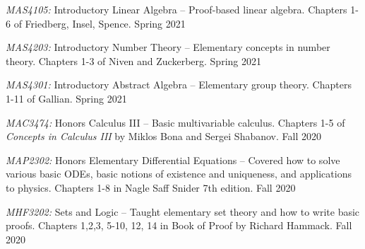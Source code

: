 \documentclass[11pt]{article}
\begin{document}
\textsl{MAS4105:} Introductory Linear Algebra -- Proof-based linear algebra. Chapters 1-6 of Friedberg, Insel, Spence. Spring 2021

\textsl{MAS4203:} Introductory Number Theory -- Elementary concepts in number theory. Chapters 1-3 of Niven and Zuckerberg. Spring 2021

\textsl{MAS4301:} Introductory Abstract Algebra -- Elementary group theory. Chapters 1-11 of Gallian. Spring 2021

\textsl{MAC3474:} Honors Calculus III -- Basic multivariable calculus. Chapters 1-5 of \textsl{Concepts in Calculus III} by Miklos Bona and Sergei Shabanov. Fall 2020

\textsl{MAP2302:} Honors Elementary Differential Equations -- Covered how to solve various basic ODEs, basic notions of existence and uniqueness, and applications to physics. Chapters 1-8 in Nagle Saff Snider 7th edition. Fall 2020

\textsl{MHF3202:} Sets and Logic -- Taught elementary set theory and how to write basic proofs. Chapters 1,2,3, 5-10, 12, 14 in Book of Proof by Richard Hammack. Fall 2020
\end{document}
